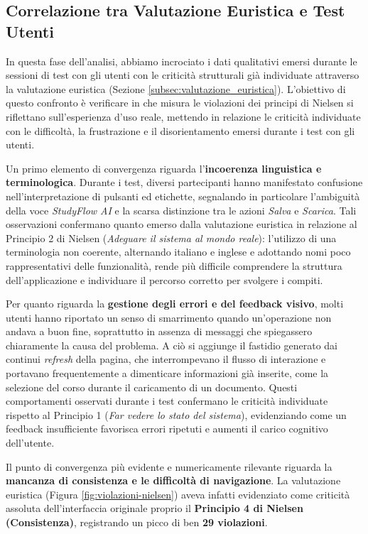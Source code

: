 \subsection{Correlazione tra Valutazione Euristica e Test Utenti}

In questa fase dell'analisi, abbiamo incrociato i dati qualitativi emersi durante le sessioni di test con gli utenti con le criticità strutturali già individuate attraverso la valutazione euristica (Sezione \ref{subsec:valutazione_euristica}). L'obiettivo di questo confronto è verificare in che misura le violazioni dei principi di Nielsen si riflettano sull'esperienza d'uso reale, mettendo in relazione le criticità individuate con le difficoltà, la frustrazione e il disorientamento emersi durante i test con gli utenti.

Un primo elemento di convergenza riguarda l'\textbf{incoerenza linguistica e terminologica}. Durante i test, diversi partecipanti hanno manifestato confusione nell'interpretazione di pulsanti ed etichette, segnalando in particolare l'ambiguità della voce \textit{StudyFlow AI} e la scarsa distinzione tra le azioni \textit{Salva} e \textit{Scarica}. Tali osservazioni confermano quanto emerso dalla valutazione euristica in relazione al Principio 2 di Nielsen (\textit{Adeguare il sistema al mondo reale}): l'utilizzo di una terminologia non coerente, alternando italiano e inglese e adottando nomi poco rappresentativi delle funzionalità, rende più difficile comprendere la struttura dell'applicazione e individuare il percorso corretto per svolgere i compiti.

Per quanto riguarda la \textbf{gestione degli errori e del feedback visivo}, molti utenti hanno riportato un senso di smarrimento quando un'operazione non andava a buon fine, soprattutto in assenza di messaggi che spiegassero chiaramente la causa del problema. A ciò si aggiunge il fastidio generato dai continui \textit{refresh} della pagina, che interrompevano il flusso di interazione e portavano frequentemente a dimenticare informazioni già inserite, come la selezione del corso durante il caricamento di un documento. Questi comportamenti osservati durante i test confermano le criticità individuate rispetto al Principio 1 (\textit{Far vedere lo stato del sistema}), evidenziando come un feedback insufficiente favorisca errori ripetuti e aumenti il carico cognitivo dell'utente.

Il punto di convergenza più evidente e numericamente rilevante riguarda la \textbf{mancanza di consistenza e le difficoltà di navigazione}. La valutazione euristica (Figura \ref{fig:violazioni-nielsen}) aveva infatti evidenziato come criticità assoluta dell'interfaccia originale proprio il \textbf{Principio 4 di Nielsen (Consistenza)}, registrando un picco di ben \textbf{29 violazioni}.

